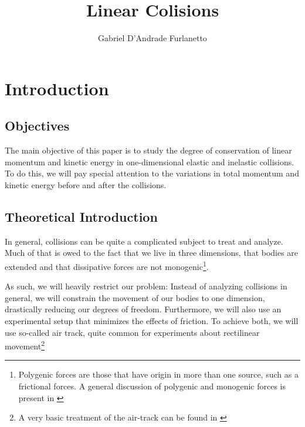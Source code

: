 \documentclass[a4paper,12pt]{article}
\begin{document}
\title{Linear Colisions}
\author{Gabriel D'Andrade Furlanetto}
\maketitle
{}
\pagebreak 


\section{Introduction}

\subsection{Objectives}
The main objective of this paper is to study the degree of conservation of linear momentum and kinetic energy in one-dimensional elastic and inelastic collisions. To do this, we will pay special attention to the variations in total momentum and kinetic energy before and after the collisions.

\subsection{Theoretical Introduction}

In general, collisions can be quite a complicated subject to treat and analyze. Much of that is owed to the fact that we live in three dimensions, that bodies are extended and that dissipative forces are not monogenic\footnote{Polygenic forces are those that have origin in more than one source, such as a frictional forces. A general discussion of polygenic and monogenic forces is present in \cite[30]{lanczos}}. 

As such, we will heavily restrict our problem: Instead of analyzing collisions in general, we will constrain the movement of our bodies to one dimension, drastically reducing our degrees of freedom. Furthermore, we will also use an experimental setup that minimizes the effects of friction. To achieve both, we will use so-called air track, quite common for experiments about rectilinear movement\footnote{A very basic treatment of the air-track can be found in \cite[54]{kolenkow}}
\end{document}
